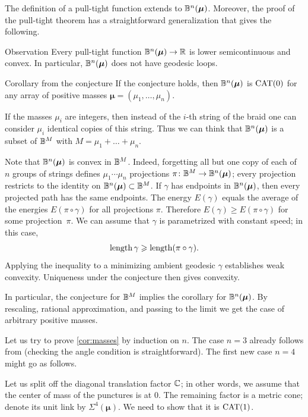 \documentclass[a4paper,10pt]{article}
\begin{document}
The definition of a pull-tight function extends to $\mathbb{B}^n(\bm{\mu})$.
Moreover, the proof of the pull-tight theorem has a straightforward generalization that gives the following.

\begin{thm}{Observation}
Every pull-tight function $\mathbb{B}^n(\bm{\mu})\to\mathbb{R}$ is lower semicontinuous and convex.
In particular, $\mathbb{B}^n(\bm{\mu})$ does not have geodesic loops.
\end{thm}

\begin{thm}{Corollary from the conjecture}\label{cor:masses}
If the conjecture holds, then $\mathbb{B}^n(\bm{\mu})$ is $\operatorname{\rm CAT}(0)$ for any array of positive masses $\bm{\mu}=(\mu_1,\ldots,\mu_n)$.
\end{thm}

If the masses $\mu_i$ are integers, then instead of the $i$-th string of the braid one can consider $\mu_i$ identical copies of this string.
Thus we can think that $\mathbb{B}^n(\bm{\mu})$ is a subset of $\mathbb{B}^M$ with $M=\mu_1+\ldots+\mu_n$.

Note that $\mathbb{B}^n(\bm{\mu})$ is convex in $\mathbb{B}^M$.
Indeed, forgetting all but one copy of each of $n$ groups of strings defines $\mu_1\cdots\mu_n$ projections $\pi\colon\mathbb{B}^M\to \mathbb{B}^n(\bm{\mu})$; every projection restricts to the identity on $\mathbb{B}^n(\bm{\mu})\subset\mathbb{B}^M$.
If $\gamma$ has endpoints in $\mathbb{B}^n(\bm{\mu})$, then every projected path has the same endpoints.
The energy $E(\gamma)$ equals the average of the energies $E(\pi\circ\gamma)$ for all projections $\pi$.
Therefore  $E(\gamma)\ge E(\pi\circ\gamma)$ for some projection~$\pi$.
We can assume that $\gamma$ is parametrized with constant speed; in this case, \[\mathop{\rm length}\nolimits\gamma\geqslant \mathop{\rm length}\nolimits(\pi\circ\gamma).\]
Applying the inequality to a minimizing ambient geodesic $\gamma$ establishes weak convexity.
Uniqueness under the conjecture then gives convexity.

In particular, the conjecture for $\mathbb{B}^M$ implies the corollary for $\mathbb{B}^n(\bm{\mu})$.
By rescaling, rational approximation, and passing to the limit we get the case of arbitrary positive masses.
\qeds

 Let us try to prove \ref{cor:masses} by induction on $n$.
The case $n=3$ already follows from \cite{charney-davis-93} (checking the angle condition is straightforward).
The first new case $n=4$ might go as follows.

Let us split off the diagonal translation factor $\mathbb{C}$; in other words, we assume that the center of mass of the punctures is at $0$.
The remaining factor is a metric cone; denote its unit link by $\Sigma^4(\bm{\mu})$.
We need to show that it is $\operatorname{\rm CAT}(1)$.
\end{document}
